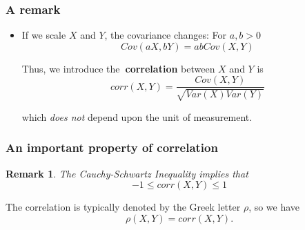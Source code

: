 \documentclass[notes=show,handout]{beamer}\usepackage[]{graphicx}\usepackage[]{color}
\newenvironment{stepitemize}{\begin{itemize}[<+->]}{\end{itemize} }
\newtheorem{remark}{Remark}[section]
\begin{document}
\begin{frame}
\frametitle{A remark}

\begin{stepitemize}
\item If we scale $X$ and $Y$, the covariance changes: For $a,b>0$%
\begin{equation*}
Cov\left( aX,bY\right) =abCov\left( X,Y\right)
\end{equation*}

Thus, we introduce the\textbf{\ correlation} between $X$ and $Y$ is
\begin{equation*}
corr\left( X,Y\right) =\frac{Cov\left( X,Y\right) }{\sqrt{Var\left( X\right)
Var\left( Y\right) }}
\end{equation*}

which \emph{does not }depend upon the unit of measurement.


\end{stepitemize}


\end{frame}


%


\begin{frame}%
%
\frametitle{An important property of correlation}
\begin{remark}
The Cauchy-Schwartz Inequality implies that
\begin{equation*}
-1\leq corr\left( X,Y\right) \leq 1
\end{equation*}
\end{remark}

\vspace{0.4cm}

The correlation is typically denoted by the Greek letter $\rho$, so we have
$$
\rho(X,Y)= corr\left( X,Y\right).
$$
\end{frame}%
\end{document}
